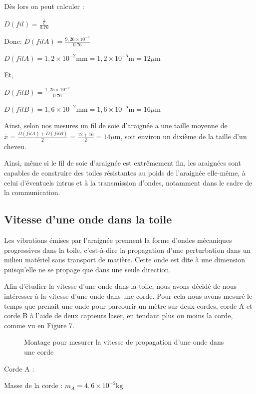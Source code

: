 Dès lors on peut calculer :

\( D(fil) = \frac{\frac{1}{L}}{0.76}\)

Donc: 
\(D(filA) = \frac{9,26\times10^{-3}}{0.76}\)


\(D(filA) = 1,2\times10^{-2} \text{mm} = 1,2\times10^{-5} \text{m} = 12 \mu\text{m}\)

Et,

\(D(filB) = \frac{1,25\times10^{-2}}{0.76}\)


\(D(filB) = 1,6\times10^{-2} \text{mm} = 1,6\times10^{-5} \text{m} = 16 \mu\text{m}\)

Ainsi, selon nos mesures un fil de soie d'araignée a une taille moyenne
de \( \bar{x} = \frac{D(filA) + D(filB)}{2} = \frac{12 + 16}{2} = 14 \mu\text{m}\), soit environ un dixième de la taille d'un cheveu.

Ainsi, même si le fil de soie d'araignée est extrêmement fin, les
araignées sont capables de construire des toiles résistantes au poids de
l'araignée elle-même, à celui d'éventuels intrus et à la transmission
d'ondes, notamment dans le cadre de la communication.

\subsection{Vitesse d'une onde dans la toile}

Les vibrations émises par l'araignée prennent la forme d'ondes
mécaniques progressives dans la toile, c'est-à-dire la propagation d'une
perturbation dans un milieu matériel sans transport de matière. Cette
onde est dite à une dimension puisqu'elle ne se propage que dans une
seule direction.

Afin d'étudier la vitesse d'une onde dans la toile, nous avons décidé de
nous intéresser à la vitesse d'une onde dans une corde. Pour cela nous
avons mesuré le temps que prenait une onde pour parcourir un mètre sur
deux cordes, corde A et corde B à l'aide de deux capteurs laser, en
tendant plus ou moins la corde, comme vu en Figure 7.

\begin{figure}[htb!]
	\centering
	\def\svgwidth{\columnwidth}
	
	\caption{Montage pour mesurer la vitesse de propagation d'une onde dans une corde}
\end{figure}

Corde A :

Masse de la corde : \(m_A = 4,6\times10^{-2} \text{kg}\)

